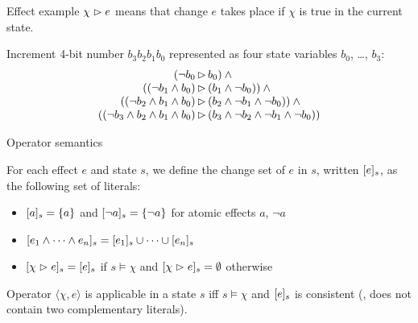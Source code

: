 \documentclass{gkibeamer}
\begin{document}
\begin{frame}{Effect example}
  $\chi \vartriangleright e$ means that change $e$ takes place if $\chi$ is true in the
  current state.

  \begin{example}
    Increment 4-bit number $b_3b_2b_1b_0$ represented as four state
    variables $b_0$, \dots, $b_3$:
    \[
      \begin{array}{r@{\,}c@{\,}l}
        (\neg b_0 & \CEF
        & b_0) \land {} \\
        ((\neg b_1 \land b_0)
        & \CEF & (b_1 \land \neg b_0)) \land {} \\
        ((\neg b_2 \land b_1 \land b_0)
        & \CEF & (b_2 \land \neg b_1 \land \neg b_0)) \land {} \\
        ((\neg b_3 \land b_2 \land b_1 \land b_0)
        & \CEF & (b_3 \land \neg b_2 \land \neg b_1 \land \neg b_0))
      \end{array}
      \]
  \end{example}
\end{frame}

\begin{frame}{Operator semantics}
  \begin{definition}
    For each effect $e$ and state $s$, we define the \alert{change
      set} of $e$ in $s$, written \alert{$\lbrack e\rbrack_{s}$}, as the
    following set of literals:
    \begin{itemize}
    \item $\lbrack a\rbrack_{s} = \{a\}$ and $\lbrack \neg a\rbrack_{s} = \{\neg
        a\}$ for atomic effects $a$, $\neg a$
    \item $\lbrack e_1 \land \dots \land e_n\rbrack_{s} =
      \lbrack e_1\rbrack_{s} \cup \dots \cup \lbrack e_n\rbrack_{s}$
    \item $\lbrack \chi \vartriangleright e\rbrack_{s} = \lbrack e\rbrack_{s}$ if $s \models \chi$ and
      $\lbrack \chi\vartriangleright e\rbrack_{s} = \emptyset$ otherwise
    \end{itemize}
  \end{definition}

  \begin{definition}
    Operator $\langle \chi,e\rangle$ is \alert{applicable in a state $s$}
    iff $s \models \chi$ and $\lbrack e\rbrack_{s}$ is consistent
    (\ie, does not contain two complementary literals).
  \end{definition}
\end{frame}
\end{document}
